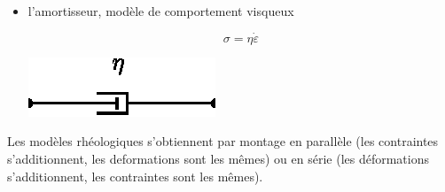 \begin{itemize}
\begin{multicols}{2}
\begin{center}
            \end{center}
        \end{multicols}
    \item l'amortisseur, modèle de comportement visqueux
        \begin{multicols}{2}
            \begin{equation}
                \sigma = \eta \dot \varepsilon
                \label{eq:Ch04-041}
            \end{equation}
            \columnbreak
            \begin{center}
                \includegraphics{../images/T1_Ch04-0024}
            \end{center}
        \end{multicols}
\end{itemize}
Les modèles rhéologiques s'obtiennent par montage en parallèle (les contraintes s'additionnent, les deformations sont les mêmes) ou en série (les déformations s'additionnent, les contraintes sont les mêmes).


